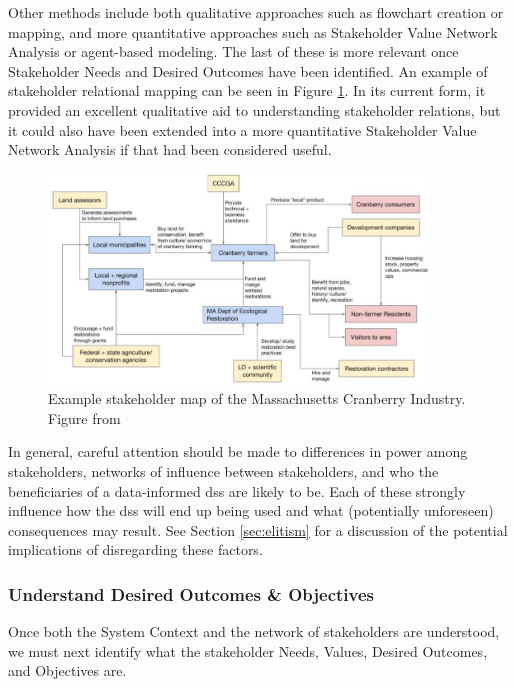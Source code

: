 Other methods include both qualitative approaches such as flowchart creation or mapping, and more quantitative approaches such as Stakeholder Value Network Analysis \cite{fengDependencyStructureMatrix2010a} or agent-based modeling. The last of these is more relevant once Stakeholder Needs and Desired Outcomes have been identified. An example of stakeholder relational mapping can be seen in Figure \ref{fig:jaffe-stakeholder}. In its current form, it provided an excellent qualitative aid to understanding stakeholder relations, but it could also have been extended into a more quantitative Stakeholder Value Network Analysis if that had been considered useful.

\begin{figure}[!htb] 
\centering
\includegraphics[width=0.9\textwidth]{Figures/chap3/jaffe-stakeholder.png}
\caption[Example stakeholder map of the Massachusetts Cranberry Industry]{Example stakeholder map of the Massachusetts Cranberry Industry. Figure from \cite{jaffeEnvironmentalEconomicSystems2022}}
\label{fig:jaffe-stakeholder}
\end{figure}

In general, careful attention should be made to differences in power among stakeholders, networks of influence between stakeholders, and who the beneficiaries of a data-informed \ac{dss} are likely to be. Each of these strongly influence how the \ac{dss} will end up being used and what (potentially unforeseen) consequences may result. See Section \ref{sec:elitism} for a discussion of the potential implications of disregarding these factors.

\subsubsection{Understand Desired Outcomes \& Objectives} \label{sec:desired-outcomes}

Once both the System Context and the network of stakeholders are understood, we must next identify what the stakeholder Needs, Values, Desired Outcomes, and Objectives are.

